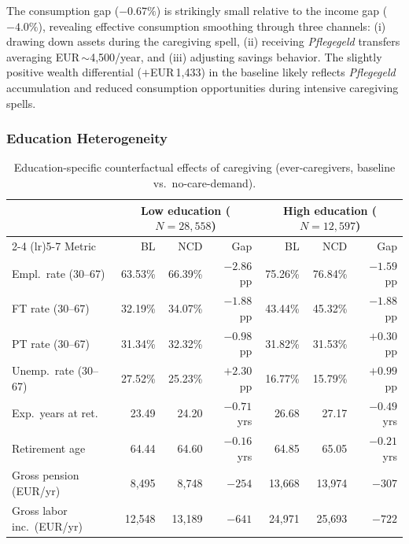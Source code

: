 The consumption gap ($-0.67\%$) is strikingly small relative to the income gap ($-4.0\%$), revealing effective consumption smoothing through three channels: (i) drawing down assets during the caregiving spell, (ii) receiving \textit{Pflegegeld} transfers averaging EUR\,$\sim$4,500/year, and (iii) adjusting savings behavior. The slightly positive wealth differential ($+$EUR\,1,433) in the baseline likely reflects \textit{Pflegegeld} accumulation and reduced consumption opportunities during intensive caregiving spells.

\subsubsection{Education Heterogeneity}

\begin{table}[htbp]
  \centering
  \caption{Education-specific counterfactual effects of caregiving (ever-caregivers, baseline vs.\ no-care-demand).}
  \label{tab:education_ncd}
  \small
  \begin{tabular}{lrrrrrr}
    \toprule
    & \multicolumn{3}{c}{Low education ($N = 28{,}558$)} & \multicolumn{3}{c}{High education ($N = 12{,}597$)} \\
    \cmidrule(lr){2-4} \cmidrule(lr){5-7}
    Metric & BL & NCD & Gap & BL & NCD & Gap \\
    \midrule
    Empl.\ rate (30--67) & 63.53\% & 66.39\% & $-2.86$ pp & 75.26\% & 76.84\% & $-1.59$ pp \\
    FT rate (30--67) & 32.19\% & 34.07\% & $-1.88$ pp & 43.44\% & 45.32\% & $-1.88$ pp \\
    PT rate (30--67) & 31.34\% & 32.32\% & $-0.98$ pp & 31.82\% & 31.53\% & $+0.30$ pp \\
    Unemp.\ rate (30--67) & 27.52\% & 25.23\% & $+2.30$ pp & 16.77\% & 15.79\% & $+0.99$ pp \\
    \addlinespace
    Exp.\ years at ret. & 23.49 & 24.20 & $-0.71$ yrs & 26.68 & 27.17 & $-0.49$ yrs \\
    Retirement age & 64.44 & 64.60 & $-0.16$ yrs & 64.85 & 65.05 & $-0.21$ yrs \\
    Gross pension (EUR/yr) & 8,495 & 8,748 & $-254$ & 13,668 & 13,974 & $-307$ \\
    Gross labor inc.\ (EUR/yr) & 12,548 & 13,189 & $-641$ & 24,971 & 25,693 & $-722$ \\
    \bottomrule
  \end{tabular}
\end{table}

